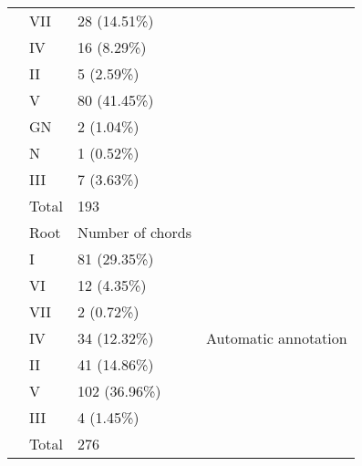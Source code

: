 \begin{table}[]
\begin{tabular}{llll}
 & VII & 28 (14.51\%) &  \\
 & IV & 16 (8.29\%) &  \\
 & II & 5 (2.59\%) &  \\
 & V & 80 (41.45\%) &  \\
 & GN & 2 (1.04\%) &  \\
 & N & 1 (0.52\%) &  \\
 & III & 7 (3.63\%) &  \\
 & Total & 193 &  \\
 & Root & Number of chords & \multirow{9}{*}{Automatic annotation} \\
 & I & 81 (29.35\%) &  \\
 & VI & 12 (4.35\%) &  \\
 & VII & 2 (0.72\%) &  \\
 & IV & 34 (12.32\%) &  \\
 & II & 41 (14.86\%) &  \\
 & V & 102 (36.96\%) &  \\
 & III & 4 (1.45\%) &  \\
 & Total & 276 &
\end{tabular}
\label{my-label}
\end{table}



\newpage
